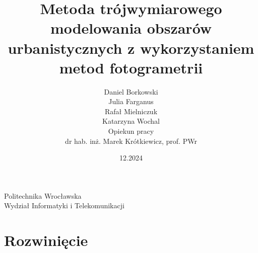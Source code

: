 \documentclass{article}
\title{Metoda trójwymiarowego modelowania obszarów urbanistycznych z wykorzystaniem metod fotogrametrii}
\author{
    Daniel Borkowski\\
    \And
    Julia Farganus\\
    \And
    Rafał Mielniczuk\\
    \And
    Katarzyna Wochal\\
    \And 
    Opiekun pracy\\
    dr hab. inż. Marek Krótkiewicz, prof. PWr \\
}
\date{12.2024}
\begin{document}
\maketitle

\begin{center}
    Politechnika Wrocławska\\
    Wydział Informatyki i Telekomunikacji\\
\end{center}

\vspace{0.5cm}



\section{Rozwinięcie}









\end{document}
